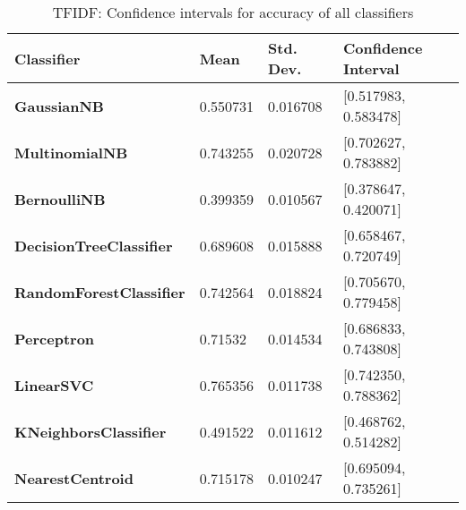 \documentclass{article}
\begin{document}
\begin{table}[h]
\begin{tabular}{l|lll}
\textbf{Classifier}             & \textbf{Mean} & \textbf{Std. Dev.} & \textbf{Confidence Interval} \\ \hline
\textbf{GaussianNB}             & 0.550731      & 0.016708                    & {[}0.517983, 0.583478{]}     \\
\textbf{MultinomialNB}          & 0.743255      & 0.020728                    & {[}0.702627, 0.783882{]}     \\
\textbf{BernoulliNB}            & 0.399359      & 0.010567                    & {[}0.378647, 0.420071{]}     \\
\textbf{DecisionTreeClassifier} & 0.689608      & 0.015888                    & {[}0.658467, 0.720749{]}     \\
\textbf{RandomForestClassifier} & 0.742564      & 0.018824                    & {[}0.705670, 0.779458{]}     \\
\textbf{Perceptron}             & 0.71532       & 0.014534                    & {[}0.686833, 0.743808{]}     \\
\textbf{LinearSVC}              & 0.765356      & 0.011738                    & {[}0.742350, 0.788362{]}     \\
\textbf{KNeighborsClassifier}   & 0.491522      & 0.011612                    & {[}0.468762, 0.514282{]}     \\
\textbf{NearestCentroid}        & 0.715178      & 0.010247                    & {[}0.695094, 0.735261{]}    
\end{tabular}
\caption {TFIDF: Confidence intervals for accuracy of all classifiers}
\end{table}
\end{document}
